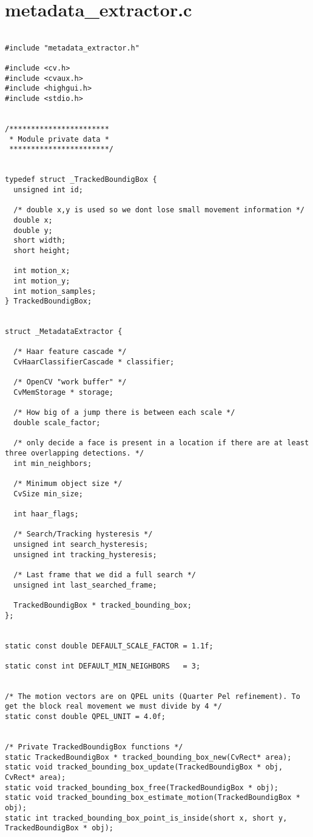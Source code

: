 \section{metadata\_extractor.c}


\begin{lstlisting}

#include "metadata_extractor.h"

#include <cv.h>
#include <cvaux.h>
#include <highgui.h>
#include <stdio.h>


/*********************** 
 * Module private data * 
 ***********************/


typedef struct _TrackedBoundigBox {
  unsigned int id;
  
  /* double x,y is used so we dont lose small movement information */
  double x; 
  double y;
  short width;
  short height;

  int motion_x;
  int motion_y;
  int motion_samples;
} TrackedBoundigBox;


struct _MetadataExtractor {

  /* Haar feature cascade */
  CvHaarClassifierCascade * classifier;

  /* OpenCV "work buffer" */
  CvMemStorage * storage;

  /* How big of a jump there is between each scale */
  double scale_factor;

  /* only decide a face is present in a location if there are at least three overlapping detections. */
  int min_neighbors;

  /* Minimum object size */
  CvSize min_size;

  int haar_flags;

  /* Search/Tracking hysteresis */
  unsigned int search_hysteresis;
  unsigned int tracking_hysteresis;
  
  /* Last frame that we did a full search */
  unsigned int last_searched_frame;

  TrackedBoundigBox * tracked_bounding_box;
};


static const double DEFAULT_SCALE_FACTOR = 1.1f;

static const int DEFAULT_MIN_NEIGHBORS   = 3;


/* The motion vectors are on QPEL units (Quarter Pel refinement). To get the block real movement we must divide by 4 */
static const double QPEL_UNIT = 4.0f;


/* Private TrackedBoundigBox functions */
static TrackedBoundigBox * tracked_bounding_box_new(CvRect* area);
static void tracked_bounding_box_update(TrackedBoundigBox * obj, CvRect* area);
static void tracked_bounding_box_free(TrackedBoundigBox * obj);
static void tracked_bounding_box_estimate_motion(TrackedBoundigBox * obj);
static int tracked_bounding_box_point_is_inside(short x, short y, TrackedBoundigBox * obj);


\end{lstlisting}
